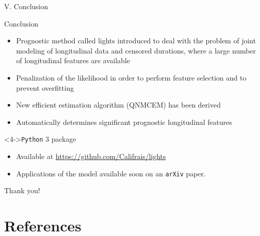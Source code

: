 \documentclass{beamer}
\begin{document}
\begin{frame}[noframenumbering]
\Large \centering
\textcolor{blue_pres}{V.} Conclusion
\end{frame}

\begin{frame}{Conclusion}

\begin{itemize}
  \item<1-> Prognostic method called lights introduced to deal with the problem of joint modeling of longitudinal data and censored durations, where a large number of longitudinal features are available
  \item<2-> Penalization of the likelihood in order to perform feature selection and to prevent overfitting
  \item<3-> New efficient estimation algorithm (QNMCEM) has been derived
  \item<4-> Automatically determines significant prognostic longitudinal features
\end{itemize}

\begin{block}<4->{\texttt{Python} 3 package}
\begin{itemize}
  \item<4-> Available at \small{\url{https://github.com/Califrais/lights}}
  \item<5-> Applications of the model available soon on an \texttt{arXiv} paper.
\end{itemize}
\end{block}

\end{frame}

\begin{frame}[noframenumbering]
\Large \centering
\textcolor{blue_pres}{} Thank you!
\end{frame}

\section{References}
\end{document}
